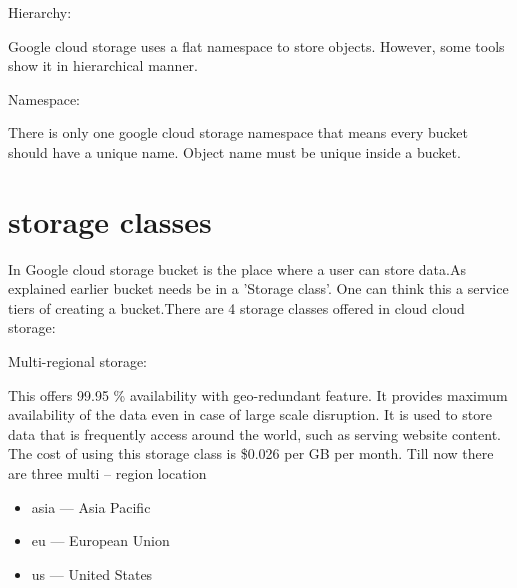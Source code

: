 \documentclass[9pt,twocolumn,twoside]{../../styles/osajnl}
\begin{document}
\begin{flushleft}
Hierarchy:

Google cloud storage uses a flat namespace to store objects. However, some tools show it in hierarchical manner.
\end{flushleft}


\begin{flushleft}
Namespace:

There is only one google cloud storage namespace that means every bucket should have a unique name. Object name must be unique inside a bucket.
\end{flushleft}


\section{storage classes}

In Google cloud storage bucket is the place where a user can store data.As explained earlier bucket needs be in a 'Storage class'. One can think this a service tiers of creating a bucket.There are 4 storage classes offered in cloud cloud storage:



\begin{flushleft}

Multi-regional storage:

This offers 99.95 \% availability with geo-redundant feature. It provides maximum availability of the data even in case of large scale disruption. It is used to store data that is frequently access around the world, such as serving website content. The cost of using this storage class is \$0.026 per GB per month. Till now there are three multi – region location 
		\begin{itemize}

			\item asia — Asia Pacific
			\item eu — European Union
			\item us — United States

		\end{itemize}
\end{flushleft}
\end{document}
